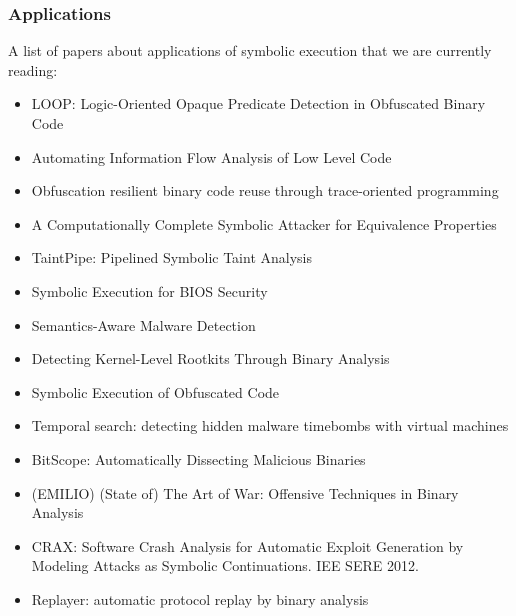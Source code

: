 \subsubsection{Applications}
A list of papers about applications of symbolic execution that we are currently reading:
\begin{itemize}
  \item \cite{LOOP-CCS15} LOOP: Logic-Oriented Opaque Predicate Detection in Obfuscated Binary Code
  \item \cite{BDG-CCS14} Automating Information Flow Analysis of Low Level Code
  \item \cite{ZFM-CCS13} Obfuscation resilient binary code reuse through trace-oriented programming
  \item \cite{BC-CCS14} A Computationally Complete Symbolic Attacker for Equivalence Properties
  \item \cite{MWX-USEC15} TaintPipe: Pipelined Symbolic Taint Analysis
  \item \cite{BLR-WOOT15} Symbolic Execution for {BIOS} Security
  \item \cite{CJS-SP05} Semantics-Aware Malware Detection
  \item \cite{KRV-ACSAC04} Detecting Kernel-Level Rootkits Through Binary Analysis
  \item \cite{YBD-CCS15} Symbolic Execution of Obfuscated Code
  \item \cite{CWO-ASPLOS06} Temporal search: detecting hidden malware timebombs with virtual machines
  \item \cite{BHK-TR07} BitScope: Automatically Dissecting Malicious Binaries
  \item (EMILIO) \cite{ANGR-SP16} (State of) The Art of War: Offensive Techniques in Binary Analysis
  \item CRAX: Software Crash Analysis for Automatic Exploit Generation by Modeling Attacks as Symbolic Continuations. IEE SERE 2012.
  \item \cite{REPLAYER-CCS06} Replayer: automatic protocol replay by binary analysis
\end{itemize}

  

